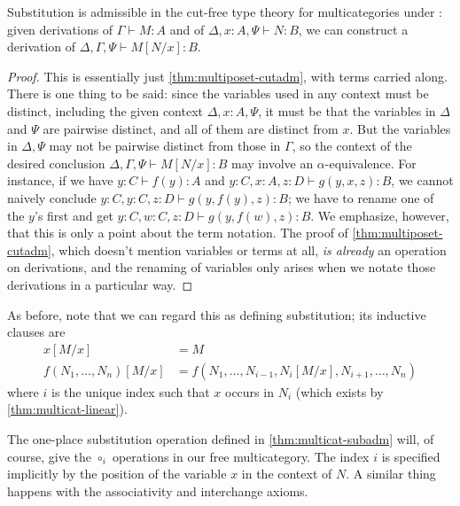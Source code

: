 \documentclass{book}
\let\types\vdash
\begin{document}
\begin{thm}\label{thm:multicat-subadm}
  Substitution is admissible in the cut-free type theory for multicategories under \cG: given derivations of $\Gamma\types M:A$ and of $\Delta,x:A,\Psi\types N:B$, we can construct a derivation of $\Delta,\Gamma,\Psi\types M[N/x]:B$.
\end{thm}
\begin{proof}
  This is essentially just \cref{thm:multiposet-cutadm}, with terms carried along.
  There is one thing to be said: since the variables used in any context must be distinct, including the given context $\Delta,x:A,\Psi$, it must be that the variables in $\Delta$ and $\Psi$ are pairwise distinct, and all of them are distinct from $x$.
  But the variables in $\Delta,\Psi$ may not be pairwise distinct from those in $\Gamma$, so the context of the desired conclusion $\Delta,\Gamma,\Psi\types M[N/x]:B$ may involve an $\alpha$-equivalence.
  For instance, if we have $y:C\types f(y):A$ and $y:C,x:A,z:D\types g(y,x,z):B$, we cannot naively conclude $y:C,y:C,z:D\types g(y,f(y),z):B$; we have to rename one of the $y$'s first and get $y:C,w:C,z:D\types g(y,f(w),z):B$.
  We emphasize, however, that this is only a point about the term notation.
  The proof of \cref{thm:multiposet-cutadm}, which doesn't mention variables or terms at all, \emph{is already} an operation on derivations, and the renaming of variables only arises when we notate those derivations in a particular way.
\end{proof}

As before, note that we can regard this as defining substitution; its inductive clauses are
\begin{align*}
  x[M/x] &= M\\
  f(N_1,\dots,N_n)[M/x] &= f(N_1,\dots,N_{i-1},N_i[M/x],N_{i+1},\dots,N_n)
\end{align*}
where $i$ is the unique index such that $x$ occurs in $N_i$ (which exists by \cref{thm:multicat-linear}).

The one-place substitution operation defined in \cref{thm:multicat-subadm} will, of course, give the $\circ_i$ operations in our free multicategory.
The index $i$ is specified implicitly by the position of the variable $x$ in the context of $N$.
A similar thing happens with the associativity and interchange axioms.
\end{document}
